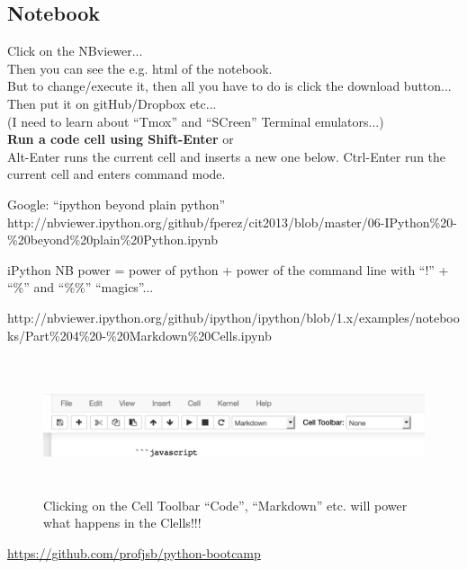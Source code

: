 \documentclass[11pt,a4paper]{article}
\begin{document}
    \subsection{Notebook}
    Click on the NBviewer...\\
    Then you can see the e.g. html of the notebook. \\
    But to change/execute it, then all you have to do is click the download button...\\
    Then put it on gitHub/Dropbox etc...\\
    (I need to learn about ``Tmox'' and ``SCreen'' Terminal emulators...)\\
  
    \noindent
    {\bf Run a code cell using Shift-Enter} or \\
    Alt-Enter runs the current cell and inserts a new one below.
    Ctrl-Enter run the current cell and enters command mode. 

    \noindent
    Google: ``ipython beyond plain python''\\
    
    http://nbviewer.ipython.org/github/fperez/cit2013/blob/master/06-IPython\%20-\%20beyond\%20plain\%20Python.ipynb

    iPython NB power = power of python + power of the command line with ``!'' + ``\%'' and ``\%\%'' ``magics''... 
    
http://nbviewer.ipython.org/github/ipython/ipython/blob/1.x/examples/notebooks/Part\%204\%20-\%20Markdown\%20Cells.ipynb

\begin{figure}
  \includegraphics[height=4.0cm,width=14.0cm]
{iPython_NB_toolbar.pdf}
      \centering
      \caption[]
              {Clicking on the Cell Toolbar ``Code'', ``Markdown'' etc. will power what happens in the Clells!!!}
      \label{fig:fig1}
    \end{figure}

\href{https://github.com/profjsb/python-bootcamp}{https://github.com/profjsb/python-bootcamp}
\end{document}
